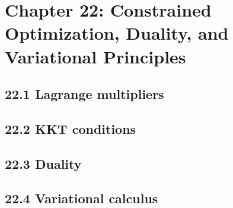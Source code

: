 \section{Chapter 22: Constrained Optimization, Duality, and Variational Principles}

\subsection{22.1 Lagrange multipliers}

\subsection{22.2 KKT conditions}

\subsection{22.3 Duality}

\subsection{22.4 Variational calculus}

\clearpage
